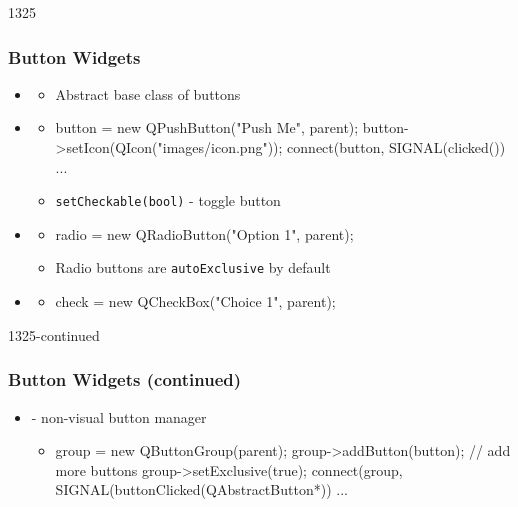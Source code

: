 \begin{slide}[fragile]{1325}
  \frametitle{Button Widgets}
 \begin{itemize}
  \item \textbf{}
    \begin{itemize}
    \item Abstract base class of buttons
   \end{itemize}
  \item \textbf{}
    \begin{itemize}
    \item[]
      \begin{cpp}
button = new QPushButton("Push Me", parent);
button->setIcon(QIcon("images/icon.png"));
connect(button, SIGNAL(clicked()) ...
      \end{cpp}
    \item \texttt{setCheckable(bool)} - toggle button
    \end{itemize}
 \item \textbf{}
   \begin{itemize}
   \item[]
     \begin{cpp}
radio = new QRadioButton("Option 1", parent);
     \end{cpp}
   \item Radio buttons are \texttt{autoExclusive} by default
   \end{itemize}
  \item \textbf{}
    \begin{itemize}
     \item[] \begin{cpp}
check = new QCheckBox("Choice 1", parent);
     \end{cpp}
  \end{itemize}
  \end{itemize}
\end{slide}

\begin{slide}[fragile]{1325-continued}
  \frametitle{Button Widgets (continued)}
 \begin{itemize}
  \item \textbf{} - non-visual button manager
    \begin{itemize}
   \item[]
     \begin{cpp}
group = new QButtonGroup(parent);
group->addButton(button); // add more buttons
group->setExclusive(true);
connect(group, SIGNAL(buttonClicked(QAbstractButton*)) ...
     \end{cpp}
   \end{itemize}
  \end{itemize}
\end{slide}

